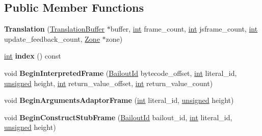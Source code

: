 \subsection*{Public Member Functions}
\begin{DoxyCompactItemize}
\item 
\mbox{\label{classv8_1_1internal_1_1Translation_ab218d753addf64427d5e6c8869a05e63}} 
{\bfseries Translation} (\mbox{\hyperlink{classv8_1_1internal_1_1TranslationBuffer}{Translation\+Buffer}} $\ast$buffer, \mbox{\hyperlink{classint}{int}} frame\+\_\+count, \mbox{\hyperlink{classint}{int}} jsframe\+\_\+count, \mbox{\hyperlink{classint}{int}} update\+\_\+feedback\+\_\+count, \mbox{\hyperlink{classv8_1_1internal_1_1Zone}{Zone}} $\ast$zone)
\item 
\mbox{\label{classv8_1_1internal_1_1Translation_a2791ed21a07f2527fdfb509e19dab71a}} 
\mbox{\hyperlink{classint}{int}} {\bfseries index} () const
\item 
\mbox{\label{classv8_1_1internal_1_1Translation_a3936c9a348ec62f049ae5ae6d9a9c595}} 
void {\bfseries Begin\+Interpreted\+Frame} (\mbox{\hyperlink{classv8_1_1internal_1_1BailoutId}{Bailout\+Id}} bytecode\+\_\+offset, \mbox{\hyperlink{classint}{int}} literal\+\_\+id, \mbox{\hyperlink{classunsigned}{unsigned}} height, \mbox{\hyperlink{classint}{int}} return\+\_\+value\+\_\+offset, \mbox{\hyperlink{classint}{int}} return\+\_\+value\+\_\+count)
\item 
\mbox{\label{classv8_1_1internal_1_1Translation_a77d66fbf76b5a76bf843b2d0dbd52e1e}} 
void {\bfseries Begin\+Arguments\+Adaptor\+Frame} (\mbox{\hyperlink{classint}{int}} literal\+\_\+id, \mbox{\hyperlink{classunsigned}{unsigned}} height)
\item 
\mbox{\label{classv8_1_1internal_1_1Translation_a8b81ca40dbaee8fb6d4ee10aa72d0bbe}} 
void {\bfseries Begin\+Construct\+Stub\+Frame} (\mbox{\hyperlink{classv8_1_1internal_1_1BailoutId}{Bailout\+Id}} bailout\+\_\+id, \mbox{\hyperlink{classint}{int}} literal\+\_\+id, \mbox{\hyperlink{classunsigned}{unsigned}} height)
\item 
\mbox{\label{classv8_1_1internal_1_1Translation_a1e24e08c8588c2157957832b094edcc2}} 

\end{DoxyCompactItemize}
